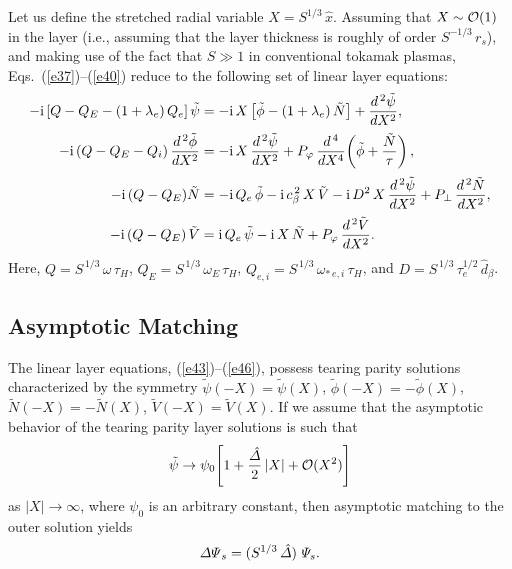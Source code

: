 \documentclass[12pt,prb,aps]{revtex4-1}
\begin{document}
 Let us define the stretched radial variable $X = S^{1/3}\,\hat{x}$.
Assuming that $X\sim{\cal O}(1)$ in the layer (i.e., assuming that the layer thickness is roughly of order $S^{-1/3}\,r_s$),
and making use of the fact that $S\gg 1$ in conventional tokamak plasmas,  Eqs.~(\ref{e37})--(\ref{e40}) reduce to the following
set of linear layer equations:\,\cite{cole}
\begin{align}\label{e43}
-{\rm i}\,[Q-Q_E-(1+\lambda_e)\,Q_{e}]\,\tilde{\psi}&= - {\rm i}\,X\left[\tilde{\phi}-(1+\lambda_e)\,\tilde{N}\right] + \frac{d^{\,2}\tilde{\psi}}{d X^2},\\[0.5ex]
-{\rm i}\,(Q-Q_E -Q_{i})\,\frac{d^{\,2}\tilde{\phi}}{dX^2}&= - {\rm i}\,X\,\frac{d^{\,2}\tilde{\psi}}{dX^2}+ P_\varphi\,\frac{d^{\,4}}{dX^4}\!\left(\tilde{\phi} + \frac{\tilde{N}}{\tau}\right),\\[0.5ex]
-{\rm i}\,(Q-Q_E)\tilde{N} &= - {\rm i}\,Q_{e}\,\tilde{\phi} - {\rm i}\,c_\beta^{\,2}\,X\,\tilde{V}  - {\rm i} \,D^{2}\,X\,\frac{d^{\,2}\tilde{\psi}}{dX^{2}}
+ P_\perp\,\frac{d^{\,2} \tilde{N}}{dX^{2}},\\[0.5ex]
 -{\rm i}\,(Q-Q_E)\,\tilde{V} &= {\rm i}\,Q_{e}\,\tilde{\psi} - {\rm i}\,X\,\tilde{N} + P_\varphi\,\frac{d^{\,2}\tilde{V}}{dX^{2}}.\label{e46}
\end{align}
Here, $Q=S^{\,1/3}\,\omega\,\tau_H$, $Q_E = S^{\,1/3}\,\omega_E\,\tau_H$, $Q_{e,i} = S^{\,1/3}\,\omega_{\ast\,e,i}\,\tau_H$,
and $D = S^{\,1/3}\,\tau_e^{1/2}\,\hat{d}_\beta$. 

\subsection{Asymptotic Matching}
The  linear layer equations, (\ref{e43})--(\ref{e46}), possess tearing parity solutions
characterized by the symmetry $\tilde{\psi}(-X)=\tilde\psi(X)$, $\tilde{\phi}(-X)=-\tilde{\phi}(X)$, 
$\tilde{N}(-X)= - \tilde{N}(X)$, $\tilde{V}(-X)=\tilde{V}(X)$. If we assume that
the asymptotic behavior of the tearing parity layer solutions is such that 
\begin{equation}\label{e47}
\tilde{\psi}\rightarrow  \psi_0\!\left[1+ \frac{\hat{\mit\Delta}}{2}\,|X| + {\cal O}(X^2)\right]
\end{equation}
as $|X|\rightarrow\infty$, where $\psi_0$ is an arbitrary constant, then asymptotic matching to the outer solution yields
\begin{equation}\label{e48}
{\mit\Delta\Psi}_s= (S^{1/3}\,\hat{\mit\Delta})\,\,{\mit\Psi}_s.
\end{equation}
\end{document}
